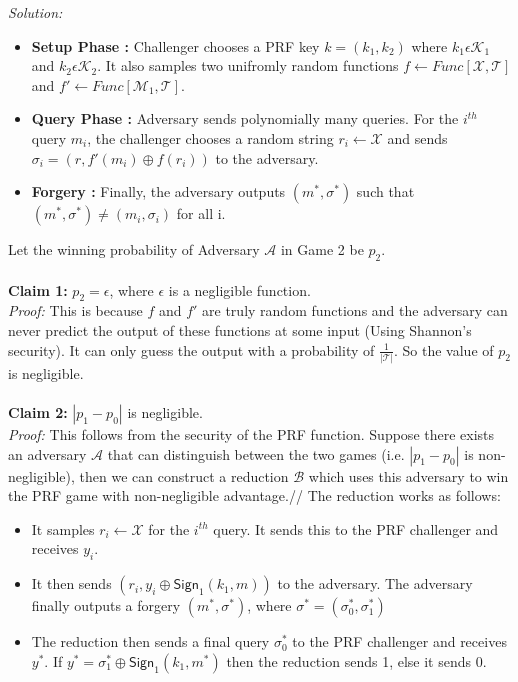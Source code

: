 \documentclass[a4paper, 11pt]{article}
\newenvironment{solution}
    {\textit{Solution:}}
    {\clearpage}
\newcommand{\sign}{\mathsf{Sign}}
\newcommand{\calA}{\mathcal{A}}
\newcommand{\calB}{\mathcal{B}}
\newcommand{\calK}{\mathcal{K}}
\newcommand{\calM}{\mathcal{M}}
\newcommand{\calX}{\mathcal{X}}
\newcommand{\calT}{\mathcal{T}}
\begin{document}
\begin{solution}
\begin{enumerate}[(a)]
\begin{itemize}
                  \item \textbf{Setup Phase :} Challenger chooses a PRF key $k = (k_1, k_2)$ where $k_1 \epsilon \calK_1$ and $k_2 \epsilon \calK_2$. It also samples two unifromly random functions $f \leftarrow Func[\calX, \calT]$ and $f' \leftarrow Func[\calM_1, \calT]$.
                  \item \textbf{Query Phase :} Adversary sends polynomially many queries. For the $i^{th}$ query $m_i$, the challenger chooses a random string $r_i \leftarrow \calX$ and sends $\sigma_i = (r, f'(m_i) \oplus f(r_i))$ to the adversary.
                  \item \textbf{Forgery :} Finally, the adversary outputs $(m^*, \sigma^*)$ such that $(m^*, \sigma^*) \neq (m_i, \sigma_i)$ for all i.
        \end{itemize}
         Let the winning probability of Adversary $\calA$ in Game 2 be $p_2$. \\ \\ 
         \textbf{Claim 1:} $p_2 = \epsilon$, where $\epsilon$ is a negligible function. \\
         \textit{Proof:} This is because $f$ and $f'$ are truly random functions and the adversary can never predict the output of these functions at some input (Using Shannon's security). It can only guess the output with a probability of $\frac{1}{|\calT|}$. So the value of $p_2$ is negligible. \\ \\ 
         \textbf{Claim 2:} $|p_1 - p_0|$ is negligible. \\
         \textit{Proof:} This follows from the security of the PRF function. Suppose there exists an adversary $\calA$ that can distinguish between the two games (i.e. $|p_1 - p_0|$ is non-negligible), then we can construct a reduction $\calB$ which uses this adversary to win the PRF game with non-negligible advantage.//
         The reduction works as follows:
         \begin{itemize}
             \item It samples $r_i \leftarrow \calX$ for the $i^{th}$ query. It sends this to the PRF challenger and receives $y_i$.
             \item It then sends $(r_i, y_i \oplus \sign_1(k_1, m))$ to the adversary. The adversary finally outputs a forgery $(m^*, \sigma^*)$, where $\sigma^* = (\sigma^*_0, \sigma^*_1)$
             \item The reduction then sends a final query $\sigma^*_0$ to the PRF challenger and receives $y^*$. If $y^* = \sigma^*_1 \oplus \sign_1(k_1, m^*)$ then the reduction sends 1, else it sends 0.

\end{itemize}
\end{enumerate}
\end{solution}
\end{document}
